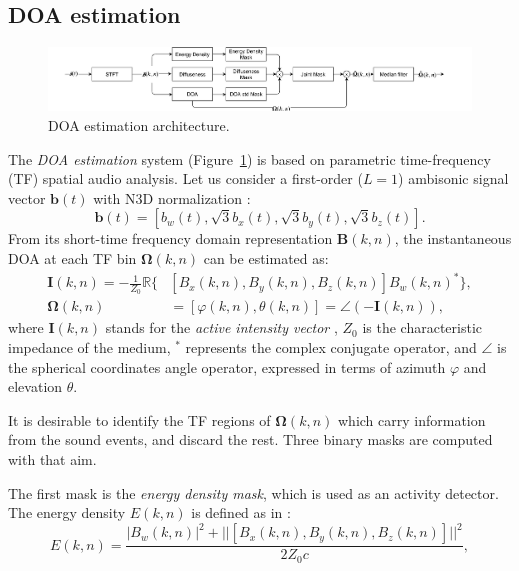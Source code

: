 \subsection{DOA estimation}
\label{ssec:doa_estimation}

\begin{figure}[h]

    \includegraphics[width=\textwidth]{Figures/SELD/DOA1.pdf}
    \caption{DOA estimation architecture.}
    \label{fig:doa}

\end{figure}

The \textit{DOA estimation} system (Figure~\ref{fig:doa}) is based on parametric time-frequency (TF) spatial audio analysis.
Let us consider a first-order ($L=1$) ambisonic signal vector $\pmb{b}(t)$ with N3D normalization \cite{carpentier2017normalization}:
\begin{equation}
    \pmb{b}(t) = [b_w(t), \sqrt{3}b_x(t),\sqrt{3}b_y(t), \sqrt{3}b_z(t)].
\end{equation}
From its short-time frequency domain representation $\pmb{B}(k,n)$, the instantaneous DOA at each TF bin $\pmb{\Omega}(k,n)$ can be estimated as:
\begin{equation}
    \begin{aligned}
    \pmb{I}(k,n) = -\frac{1}{Z_0}\mathbb{R}\{& [B_x(k,n), B_y(k,n), B_z(k,n)]  B_w(k,n)^* \},\\
    \pmb{\Omega}(k,n) &= [\varphi(k,n), \theta (k,n)] =\angle ( -\pmb{I}(k,n) ),
    \end{aligned}
\end{equation}
where $\pmb{I}(k,n)$ stands for the \textit{active intensity vector} \cite{pulkki2006directional}, $Z_0$ is the characteristic impedance of the medium, $^*$ represents the complex conjugate operator, and $\angle$ is the spherical coordinates angle operator, expressed in terms of azimuth $\varphi$ and elevation $\theta$.

It is desirable to identify the TF regions of $\pmb{\Omega}(k,n)$ which carry information from the sound events, and discard the rest. Three binary masks are computed with that aim.

The first mask is the \textit{energy density mask}, which is used as an activity detector. The energy density $E(k,n)$ is defined as in \cite{stanzial1996reactive} :
\begin{equation}
    E(k,n) = \frac{|B_w(k,n)|^2
    + || [ B_x(k,n), B_y(k,n), B_z(k,n)] ||^2}{2Z_0c},
\end{equation}

